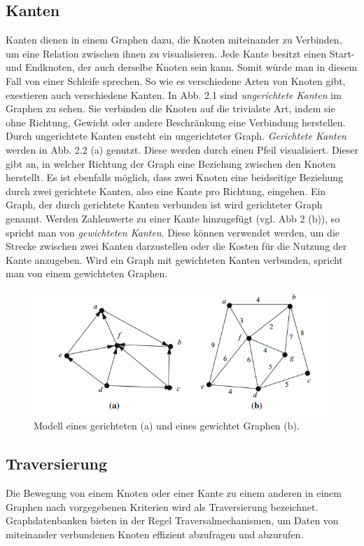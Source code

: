 \subsection{Kanten} %
\label{sec:kanten}
Kanten dienen in einem Graphen dazu, die Knoten miteinander zu Verbinden, um eine Relation zwischen ihnen zu visualisieren. Jede Kante besitzt einen Start- und Endknoten, der auch derselbe Knoten sein kann. Somit würde man in diesem Fall von einer Schleife sprechen. So wie es verschiedene Arten von Knoten gibt, exestieren auch verschiedene Kanten. 
In Abb. 2.1 sind \textit{ungerichtete Kanten} im Graphen zu sehen. Sie verbinden die Knoten auf die trivialste Art, indem sie ohne Richtung, Gewicht oder andere Beschränkung eine Verbindung herstellen. Durch ungerichtete Kanten ensteht ein ungerichteter Graph.
\textit{Gerichtete Kanten} werden in Abb. 2.2 (a) genutzt. Diese werden durch einen Pfeil visualisiert. Dieser gibt an, in welcher Richtung der Graph eine Beziehung zwischen den Knoten herstellt. Es ist ebenfalls möglich, dass zwei Knoten eine beidseitige Beziehung durch zwei gerichtete Kanten, also eine Kante pro Richtung, eingehen. Ein Graph, der durch gerichtete Kanten verbunden ist wird gerichteter Graph genannt.
Werden Zahlenwerte zu einer Kante hinzugefügt (vgl. Abb 2 (b)), so spricht man von \textit{gewichteten Kanten}. Diese können verwendet werden, um die Strecke zwischen zwei Kanten darzustellen oder die Kosten für die Nutzung der Kante anzugeben. Wird ein Graph mit gewichteten Kanten verbunden, spricht man von einem gewichteten Graphen.\citep{graphTheory}
\begin{figure}[H]
	\centering
	\includegraphics[scale=1]{Illustrations/graph_01.png}
	\caption{Modell eines gerichteten (a) und eines gewichtet Graphen (b). \citep{graphTheory}}
\end{figure}

\subsection{Traversierung} %
\label{sec:traversierung}
Die Bewegung von einem Knoten oder einer Kante zu einem anderen in einem Graphen nach vorgegebenen Kriterien wird als Traversierung bezeichnet. Graphdatenbanken bieten in der Regel Traversalmechanismen, um Daten von miteinander verbundenen Knoten effizient abzufragen und abzurufen. \cite{graph}


